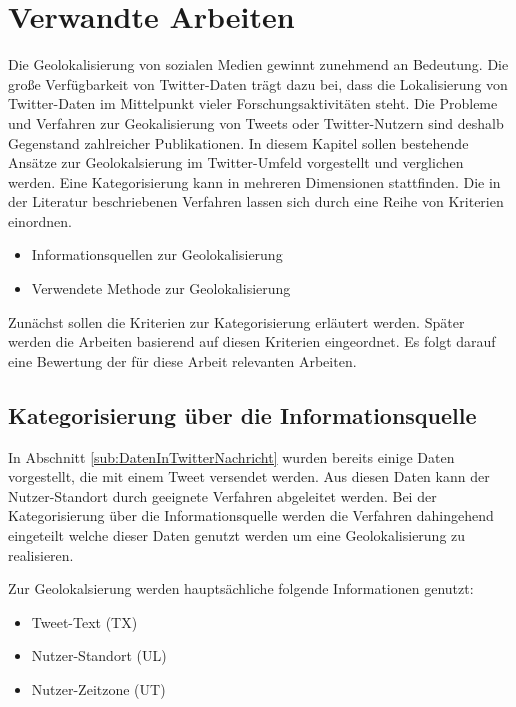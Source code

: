 \chapter{Verwandte Arbeiten} \label{chap:VerwandteArbeiten} 

	Die Geolokalisierung von sozialen Medien gewinnt zunehmend an Bedeutung. 
	Die große Verfügbarkeit von Twitter-Daten trägt dazu bei, dass die Lokalisierung von Twitter-Daten im Mittelpunkt vieler Forschungsaktivitäten steht. 
	Die Probleme und Verfahren zur Geokalisierung von Tweets oder Twitter-Nutzern sind deshalb Gegenstand zahlreicher Publikationen. 
	In diesem Kapitel sollen bestehende Ansätze zur Geolokalsierung im Twitter-Umfeld vorgestellt und verglichen werden. 
	Eine Kategorisierung kann in mehreren Dimensionen stattfinden.
	Die in der Literatur beschriebenen Verfahren lassen sich durch eine Reihe von Kriterien einordnen.

	\begin{itemize}
		\item Informationsquellen zur Geolokalisierung
		\item Verwendete Methode zur Geolokalisierung
	\end{itemize}

	Zunächst sollen die Kriterien zur Kategorisierung erläutert werden.
	Später werden die Arbeiten basierend auf diesen Kriterien eingeordnet.
	Es folgt darauf eine Bewertung der für diese Arbeit relevanten Arbeiten.

	\section{Kategorisierung über die Informationsquelle}
		
			In Abschnitt \ref{sub:DatenInTwitterNachricht} wurden bereits einige Daten vorgestellt, die mit einem Tweet versendet werden. 
			Aus diesen Daten kann der Nutzer-Standort durch geeignete Verfahren abgeleitet werden. 
			Bei der Kategorisierung über die Informationsquelle werden die Verfahren dahingehend eingeteilt welche dieser Daten genutzt werden um eine Geolokalisierung zu realisieren.

			Zur Geolokalsierung werden hauptsächliche folgende Informationen genutzt:

			\begin{itemize}
				\item Tweet-Text (TX)
				\item Nutzer-Standort (UL)
				\item Nutzer-Zeitzone (UT)
			\end{itemize}

